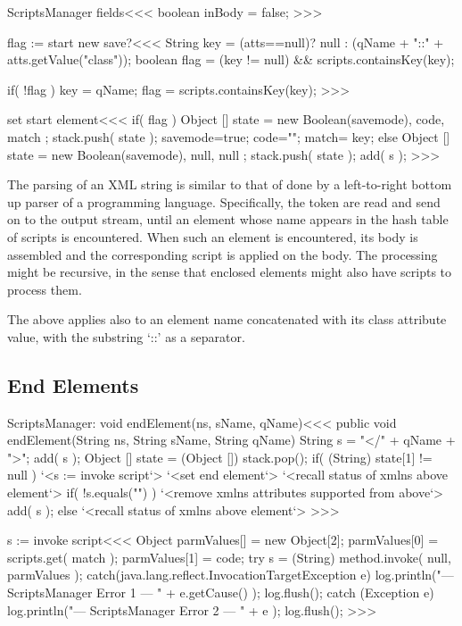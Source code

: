 \documentclass{article}
\begin{document}
\<ScriptsManager fields\><<<
boolean inBody = false;
>>>


\<flag := start new save?\><<<
String key = (atts==null)?
               null 
             : (qName + "::" + atts.getValue("class"));
boolean flag = (key != null) && scripts.containsKey(key);

if( !flag ){
   key = qName;
   flag = scripts.containsKey(key);
}
>>>

\<set start element\><<<
if( flag ){ 
   Object [] state = { new Boolean(savemode), code, match }; 
   stack.push( state );
   savemode=true; code=""; match= key;
} else {
   Object [] state = { new Boolean(savemode), null, null }; 
   stack.push( state );
}
add( s );
>>>

The parsing of an XML string is similar to that of done by a
left-to-right bottom up parser of a programming language.
Specifically, the token are read and send on to the output stream,
until an element whose name appears in the hash table of scripts is
encountered.  When such an element is encountered, its body is
assembled and the corresponding script is applied on the body.  The
processing might be recursive, in the sense that enclosed elements
might also have scripts to process them.

The above applies also to an element name concatenated with its class
attribute value, with the substring `::' as a separator.

\subsection{End Elements}



\<ScriptsManager: void endElement(ns, sName, qName)\><<<
public void endElement(String ns, String sName, String qName){
   String s = "</" + qName + ">";
   add( s );
   Object [] state = (Object []) stack.pop();     
   if( (String) state[1] != null ){ 
     `<s := invoke script`>
     `<set end element`>
     `<recall status of xmlns above element`>
     if( !s.equals("") ){
       `<remove xmlns attributes supported from above`>
       add( s );
     }
   } else { `<recall status of xmlns above element`> }
}
>>>







\<s := invoke script\><<<
Object parmValues[] = new Object[2]; 
parmValues[0] = scripts.get( match );
parmValues[1] = code; 
try { 
  s = (String) method.invoke( null, parmValues ); 
} catch(java.lang.reflect.InvocationTargetException e){
   log.println("--- ScriptsManager Error 1 --- " + e.getCause() );
   log.flush();
} catch (Exception e){
   log.println("--- ScriptsManager Error 2 --- " + e );
   log.flush();
}
>>>
\end{document}
